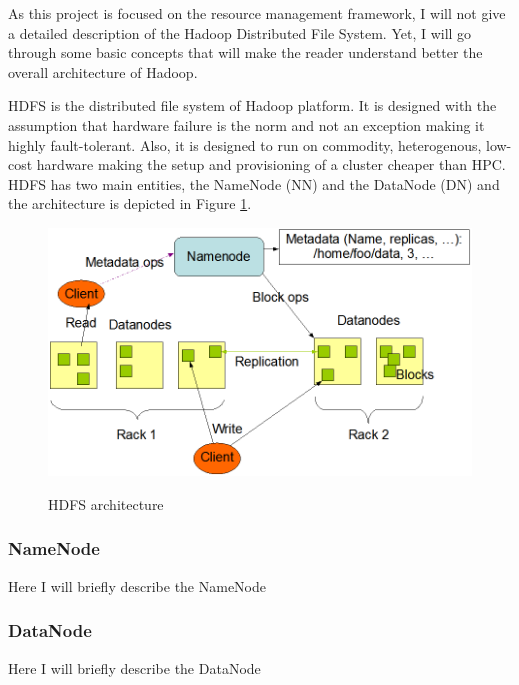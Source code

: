 As this project is focused on the resource management framework, I will
not give a detailed description of the Hadoop Distributed File
System. Yet, I will go through some basic concepts that will make the
reader understand better the overall architecture of Hadoop.

HDFS is the distributed file system of Hadoop platform. It is designed
with the assumption that hardware failure is the norm and not an
exception making it highly fault-tolerant. Also, it is designed to run
on commodity, heterogenous, low-cost hardware making the setup and provisioning of
a cluster cheaper than HPC. HDFS has two main entities, the NameNode
(NN) and the DataNode (DN) and the architecture is depicted in Figure
\ref{fig:hadoop_hdfs}.

\begin{figure}
\centering
\includegraphics[scale=0.7]{resources/images/Background/hdfs_arch.png}
\label{fig:hadoop_hdfs}
\caption{HDFS architecture}
\end{figure}

\subsubsection{NameNode}
\label{sssec:nn}

Here I will briefly describe the NameNode

\subsubsection{DataNode}
\label{sssec:dn}

Here I will briefly describe the DataNode
